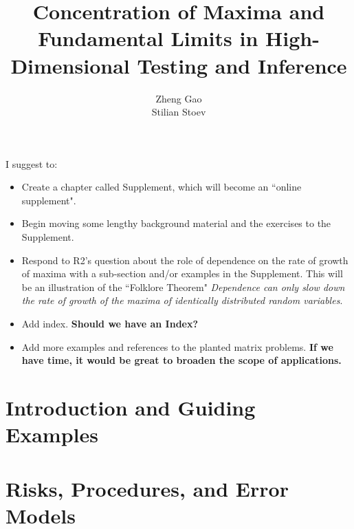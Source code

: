 \documentclass[graybox,envcountchap,sectrefs]{svmono}
\newcommand\stilian[2]{{\color{blue}\fbox{Stilian:} #1 }{\color{red}#2}}
\begin{document}
\author{Zheng Gao \\ Stilian Stoev}
\title{Concentration of Maxima and Fundamental Limits in High-Dimensional Testing and Inference}
\maketitle

\frontmatter%

%
%
%
%


\stilian{I suggest to:

\begin{itemize}
  \item Create a chapter called Supplement, which will become an ``online supplement".
  \item Begin moving some lengthy background material and the exercises to the Supplement.
  \item Respond to R2's question about the role of dependence on the rate of growth of maxima 
  with a sub-section and/or examples in the Supplement.  This will be an illustration of the ``Folklore Theorem"
  {\em Dependence can only slow down the rate of growth of the maxima of identically distributed random variables}.
  \item Add index. {\bf Should we have an Index?}
  \item Add more examples and references to the planted matrix problems.  {\bf If we have time, it would be great 
  to broaden the scope of applications.}
\end{itemize}
}{}

\tableofcontents





\mainmatter%


\chapter{Introduction and Guiding Examples}
\label{chap:intro}


\chapter{Risks, Procedures, and Error Models} %
\label{chap:background}

\end{document}
